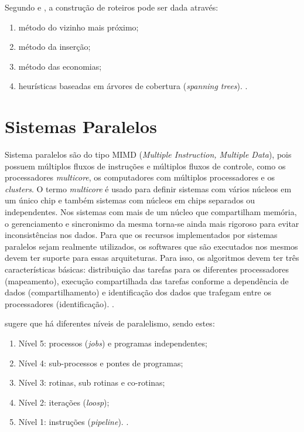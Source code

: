 Segundo \citet{laporte:2000:classical} e \citet{reinelt:1994:traveling}, a construção de roteiros pode ser dada através:

\begin{enumerate}
	\item método do vizinho mais próximo;	
	\item método da inserção;	
	\item método das economias;	
	\item heurísticas baseadas em árvores de cobertura (\textit{spanning trees}). \cite{cunha:2002:experimentos}.
\end{enumerate}

\section{Sistemas Paralelos}
\label{secao:sistemas_paralelos}

Sistema paralelos são do tipo MIMD (\textit{Multiple Instruction, Multiple Data}), pois possuem múltiplos fluxos de instruções e múltiplos fluxos de controle, como os processadores \textit{multicore}, os computadores com múltiplos processadores e os \textit{clusters}. O termo \textit{multicore} é usado para definir sistemas com vários núcleos em um único chip e também sistemas com núcleos em chips separados ou independentes. Nos sistemas com mais de um núcleo que compartilham memória, o gerenciamento e sincronismo da mesma torna-se ainda mais rigoroso para evitar inconsistências nos dados. Para que os recursos implementados por sistemas paralelos sejam realmente utilizados, os softwares que são executados nos mesmos devem ter suporte para essas arquiteturas. Para isso, os algoritmos devem ter três características básicas: distribuição das tarefas para os diferentes processadores (mapeamento), execução compartilhada das tarefas conforme a dependência de dados (compartilhamento) e identificação dos dados que trafegam entre os processadores (identificação). \cite{lima:2016:implantacao}. 

\citet{hwang:1987:advanced} sugere que há diferentes níveis de paralelismo, sendo estes:

\begin{enumerate}	
	\item Nível 5: processos (\textit{jobs}) e programas independentes;
	\item Nível 4: sub-processos e pontes de programas;
	\item Nível 3: rotinas, sub rotinas e co-rotinas;
	\item Nível 2: iterações (\textit{loosp});
	\item Nível 1: instruções (\textit{pipeline}). \citet{navaux:1989:introducao}.
\end{enumerate}


